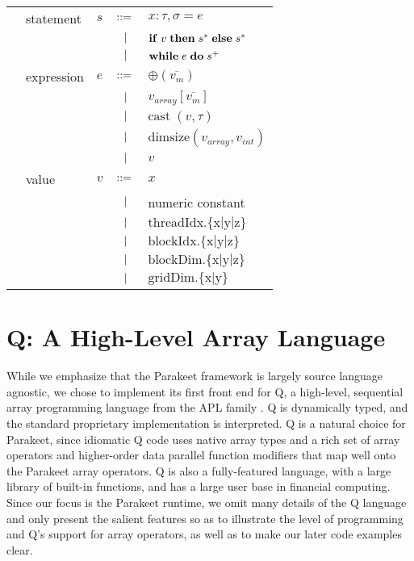 \documentclass[preprint]{sigplanconf}
\begin{document}
\begin{tabular}{m{0.1cm}m{1.2cm}m{0.1cm}m{0.2cm}p{4.7cm}}
& statement         & $s$      & $::=$ & $x : \tau, \sigma = e $         \\[2pt]
&                   &          & $\ \ | \ \ $    & $\mbox{\textbf{if}} \;v\; \mbox{\textbf{then}} \;s^*\; \mbox{\textbf{else}} \;s^*$ \\[2pt]
&                   &          & $\ \ | \ \ $    & $\mbox{\textbf{while}} \;e\; \mbox{\textbf{do}} \;s^+\;  $ \\[4pt]
& expression        & $e$      & $::=$ & $\oplus(\overline{v_m})$ \\[2pt]
&                   &          & $\ \ | \ \ $    & $v_{array}[\overline{v_m}]$ \\[2pt]
&                   &          & $\ \ | \ \ $    & $\textrm{cast} \; (v, \tau)$ \\[2pt] 
&                   &          & $\ \ | \ \ $    & $\textrm{dimsize}(v_{array}, v_{int}) $ \\[2pt]
&                   &          & $\ \ | \ \ $    & $v$ \\[4pt]
& value      & $v$ & $::=$ &  $x$ \\[2pt]
&            &     & $\ \ | \ \ $    &   numeric constant \\[2pt]
&            &     & $\ \ | \ \ $    &  $\mathrm{threadIdx.\{x|y|z\}} $\\[2pt]
&            &     & $\ \ | \ \ $    &  $\mathrm{blockIdx.\{x|y|z\}} $\\[2pt]
&            &     & $\ \ | \ \ $    &  $\mathrm{blockDim.\{x|y|z\}} $\\[2pt]
&            &     & $\ \ | \ \ $    &  $\mathrm{gridDim.\{x|y\}}    $\\[2pt]
\end{tabular}
\section{Q: A High-Level Array Language}
\label{Q}

While we emphasize that the Parakeet framework is largely source language
agnostic, we chose to implement its first front end for Q, a high-level,
sequential array programming language from the APL family \cite{Borr08}.
Q is dynamically typed, and the standard proprietary implementation is
interpreted. Q is a natural choice for Parakeet, since idiomatic Q code uses
native array types and a rich set of array operators and higher-order
data parallel function modifiers that map well onto the Parakeet array
operators. Q is also a fully-featured language, with a large library of built-in
functions, and has a large user base in financial computing. Since our
focus is the Parakeet runtime, we omit many details of the Q language and only
present the salient features so as to illustrate the level of programming
and Q's support for array operators, as well as to make our later code examples
clear.
\end{document}
